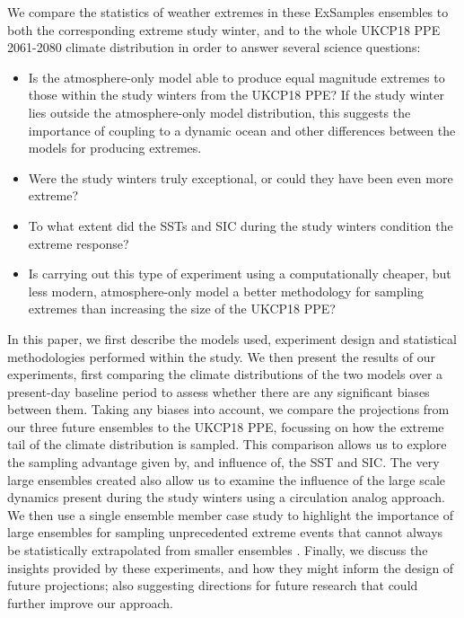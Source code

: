   We compare the statistics of weather extremes in these ExSamples ensembles to both the corresponding extreme study winter, and to the whole UKCP18 PPE 2061-2080 climate distribution in order to answer several science questions:

  \begin{itemize}
    \item Is the atmosphere-only model able to produce equal magnitude extremes to those within the study winters from the UKCP18 PPE? If the study winter lies outside the atmosphere-only model distribution, this suggests the importance of coupling to a dynamic ocean and other differences between the models for producing extremes.
    \item Were the study winters truly exceptional, or could they have been even more extreme? 
    \item To what extent did the SSTs and SIC during the study winters condition the extreme response?
    \item Is carrying out this type of experiment using a computationally cheaper, but less modern, atmosphere-only model a better methodology for sampling extremes than increasing the size of the UKCP18 PPE?
  \end{itemize}

  In this paper, we first describe the models used, experiment design and statistical methodologies performed within the study. We then present the results of our experiments, first comparing the climate distributions of the two models over a present-day baseline period to assess whether there are any significant biases between them. Taking any biases into account, we compare the projections from our three future ensembles to the UKCP18 PPE, focussing on how the extreme tail of the climate distribution is sampled. This comparison allows us to explore the sampling advantage given by, and influence of, the SST and SIC. The very large ensembles created also allow us to examine the influence of the large scale dynamics present during the study winters using a circulation analog approach. We then use a single ensemble member case study to highlight the importance of large ensembles for sampling unprecedented extreme events that cannot always be statistically extrapolated from smaller ensembles \citep{fischer_increasing_2021,gessner_very_2021}. Finally, we discuss the insights provided by these experiments, and how they might inform the design of future projections; also suggesting directions for future research that could further improve our approach.

